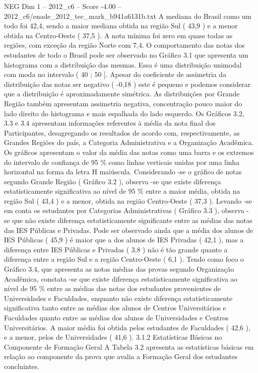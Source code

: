 \begin{textsample}{NEG Dim 1 – 2012\_c6 – Score -4.00 – 2012\_c6/enade\_2012\_tec\_mark\_b941a6131b.txt}
A mediana do Brasil como um todo foi 42,4, sendo a maior mediana obtida na região Sul ( 43,9 ) e a menor obtida na Centro-Oeste ( 37,5 ).
A nota mínima foi zero em quase todas as regiões, com exceção da região Norte com 7,4.
O comportamento das notas dos estudantes de todo o Brasil pode ser observado no Gráfico 3.1 que apresenta um histograma com a distribuição das mesmas.
Essa é uma distribuição unimodal com moda no intervalo ( 40 ; 50 ].
Apesar do coeficiente de assimetria da distribuição das notas ser negativo ( -0,18 ) este é pequeno e podemos considerar que a distribuição é aproximadamente simétrica.
As distribuições por Grande Região também apresentam assimetria negativa, concentração pouco maior do lado direito do histograma e mais espalhada do lado esquerdo.
Os Gráficos 3.2, 3.3 e 3.4 apresentam informações referentes à média da nota final dos Participantes, desagregando os resultados de acordo com, respectivamente, as Grandes Regiões do país, a Categoria Administrativa e a Organização Acadêmica.
Os gráficos apresentam o valor da média das notas como uma barra e os extremos do intervalo de confiança de 95 \% como linhas verticais unidas por uma linha horizontal na forma da letra H maiúscula.
Considerando -se o gráfico de notas segundo Grande Região ( Gráfico 3.2 ), observa -se que existe diferença estatisticamente significativa ao nível de 95 \% entre a maior média, obtida na região Sul ( 43,4 ) e a menor, obtida na região Centro-Oeste ( 37,3 ).
Levando -se em conta os estudantes por Categorias Administrativas ( Gráfico 3.3 ), observa -se que não existe diferença estatisticamente significante entre as médias das notas das IES Públicas e Privadas.
Pode ser observado ainda que a média dos alunos de IES Públicas ( 45,9 ) é maior que a dos alunos de IES Privadas ( 42,1 ), mas a diferença entre IES Públicas e Privadas ( 3,8 ) não é tão grande quanto a diferença entre a região Sul e a região Centro-Oeste ( 6,1 ).
Tendo como foco o Gráfico 3.4, que apresenta as notas médias das provas segundo Organização Acadêmica, constata -se que existe diferença estatisticamente significativa ao nível de 95 \% entre as médias das notas dos estudantes provenientes de Universidades e Faculdades, enquanto não existe diferença estatisticamente significativa tanto entre as médias dos alunos de Centros Universitários e Faculdades quanto entre as médias dos alunos de Universidades e Centros Universitários.
A maior média foi obtida pelos estudantes de Faculdades ( 42,6 ), e a menor, pelos de Universidades ( 41,6 ). 3.1.2 Estatísticas Básicas no Componente de Formação Geral A Tabela 3.2 apresenta as estatísticas básicas em relação ao componente da prova que avalia a Formação Geral dos estudantes concluintes.

\end{textsample}
